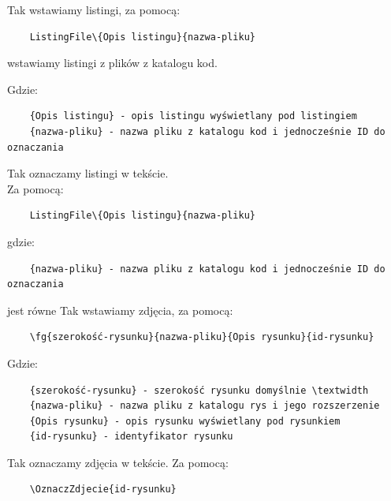 

Tak wstawiamy listingi, za pomocą:

\begin{verbatim}
	ListingFile\{Opis listingu}{nazwa-pliku} 
 \end{verbatim}

wstawiamy listingi z plików z katalogu kod.

Gdzie:
\begin{verbatim}
	{Opis listingu} - opis listingu wyświetlany pod listingiem
	{nazwa-pliku} - nazwa pliku z katalogu kod i jednocześnie ID do oznaczania
\end{verbatim}

Tak oznaczamy listingi  w tekście.\\Za pomocą:

\begin{verbatim}
	ListingFile\{Opis listingu}{nazwa-pliku} 
\end{verbatim}

gdzie:

\begin{verbatim}
	{nazwa-pliku} - nazwa pliku z katalogu kod i jednocześnie ID do oznaczania
\end{verbatim}

\clearpage


jest równe
\clearpage
Tak wstawiamy zdjęcia, za pomocą:

\begin{verbatim}
	\fg{szerokość-rysunku}{nazwa-pliku}{Opis rysunku}{id-rysunku} 
 \end{verbatim}

Gdzie:
\begin{verbatim}
	{szerokość-rysunku} - szerokość rysunku domyślnie \textwidth
	{nazwa-pliku} - nazwa pliku z katalogu rys i jego rozszerzenie
	{Opis rysunku} - opis rysunku wyświetlany pod rysunkiem
	{id-rysunku} - identyfikator rysunku
\end{verbatim}

Tak oznaczamy zdjęcia  w tekście. Za pomocą:

\begin{verbatim}
	\OznaczZdjecie{id-rysunku}
	\end{verbatim}
